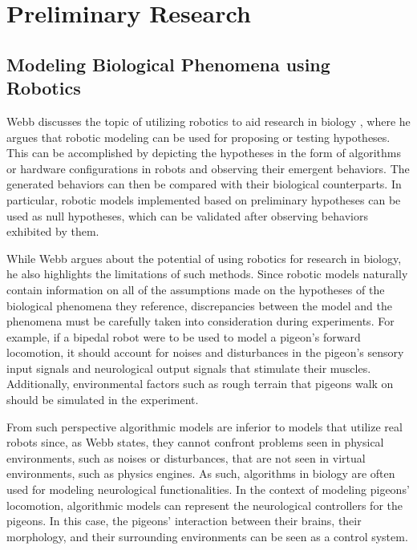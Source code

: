 \chapter{Preliminary Research} \label{ch:preliminary_research}
\section{Modeling Biological Phenomena using Robotics}
  Webb discusses the topic of utilizing robotics to aid research in biology \cite{webb2000does}, where he argues that robotic modeling can be used for proposing or testing hypotheses. This can be accomplished by depicting the hypotheses in the form of algorithms or hardware configurations in robots and observing their emergent behaviors. The generated behaviors can then be compared with their biological counterparts. In particular, robotic models implemented based on preliminary hypotheses can be used as null hypotheses, which can be validated after observing behaviors exhibited by them.

    While Webb argues about the potential of using robotics for research in biology, he also highlights the limitations of such methods.
    Since robotic models naturally contain information on all of the assumptions made on the hypotheses of the biological phenomena they reference, discrepancies between the model and the phenomena must be carefully taken into consideration during experiments. For example, if a bipedal robot were to be used to model a pigeon's forward locomotion, it should account for noises and disturbances in the pigeon's sensory input signals and neurological output signals that stimulate their muscles. Additionally, environmental factors such as rough terrain that pigeons walk on should be simulated in the experiment.

    From such perspective algorithmic models are inferior to models that utilize real robots since, as Webb states, they cannot confront problems seen in physical environments, such as noises or disturbances, that are not seen in virtual environments, such as physics engines.
      As such, algorithms in biology are often used for modeling neurological functionalities. In the context of modeling pigeons' locomotion, algorithmic models can represent the neurological controllers for the pigeons. In this case, the pigeons' interaction between their brains, their morphology, and their surrounding environments can be seen as a control system.
%

